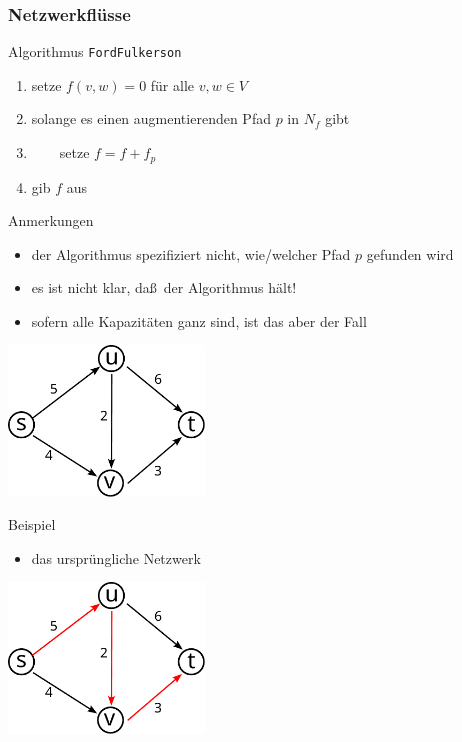 \documentclass[aspectratio=1610, 11pt]{beamer}
\newcommand{\mytitle}{Netzwerkfl\"usse}
\begin{document}
\begin{frame}\frametitle{\mytitle}
	\begin{overprint}
		\begin{exampleblock}{Algorithmus {\tt FordFulkerson}}
			\begin{enumerate}
				\item setze $f(v,w)=0$ f\"ur alle $v,w\in V$
				\item solange es einen augmentierenden Pfad $p$ in $N_f$ gibt
				\item $\qquad$setze $f=f+f_p$
				\item gib $f$ aus
			\end{enumerate}
		\end{exampleblock}
		\begin{exampleblock}{Anmerkungen}
			\begin{itemize}
				\item der Algorithmus spezifiziert nicht, wie/welcher Pfad $p$ gefunden wird
				\item es ist nicht klar, da\ss\ der Algorithmus h\"alt!
				\item sofern alle Kapazit\"aten ganz sind, ist das aber der Fall
			\end{itemize}
		\end{exampleblock}
		\begin{center}\includegraphics[height=40mm]{./images/flow4.pdf}\end{center}
\begin{exampleblock}{Beispiel}
			\begin{itemize}
				\item das urspr\"ungliche Netzwerk
			\end{itemize}
		\end{exampleblock}
		\begin{center}\includegraphics[height=40mm]{./images/flow5.pdf}\end{center}

\end{overprint}
\end{frame}
\end{document}
